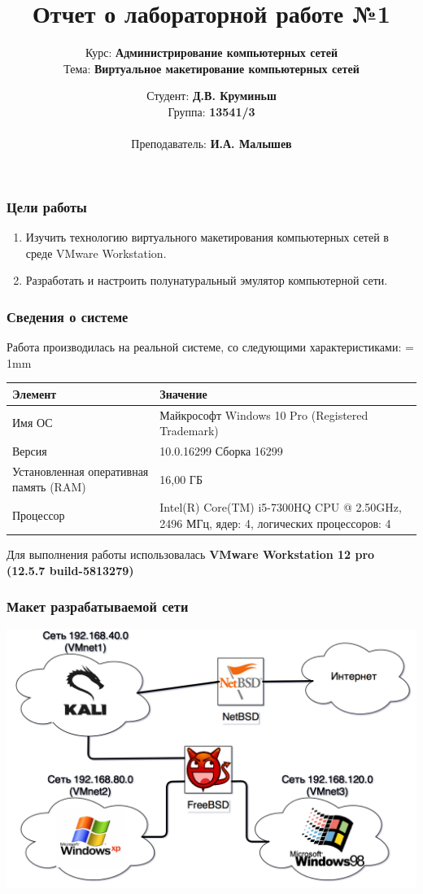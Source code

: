 \documentclass[9pt, compress]{beamer}
\author{Студент: \textbf{Д.В. Круминьш}\\ 
	Группа: \textbf{13541/3}\\ \\
	Преподаватель: \textbf{И.А. Малышев} }
\title{Отчет о лабораторной работе №1}
\subtitle{Курс: \textbf{Администрирование компьютерных сетей}\\
Тема: \textbf{Виртуальное макетирование компьютерных сетей}}
\institute{Санкт-Петербургский политехнический университет Петра Великого}
\date{ }
\begin{document}
	\maketitle
\begin{frame}
\frametitle{Цели работы}
\begin{enumerate}
\item Изучить технологию виртуального макетирования компьютерных сетей в среде VMware Workstation.
\item Разработать и настроить полунатуральный эмулятор компьютерной сети.
\end{enumerate}
\end{frame}

\begin{frame}
\frametitle{Сведения о системе}
Работа производилась на реальной системе, со следующими характеристиками:
\tabulinesep = 1mm
\begin{longtabu} to \textwidth {|X[10, c , m ] |X[25, c , m ] | }\firsthline\hline

\textbf{Элемент}&\textbf{Значение}\\ \hline \endfirsthead
	
Имя ОС&Майкрософт Windows 10 Pro (Registered Trademark)\\ \hline
Версия&10.0.16299 Сборка 16299\\ \hline
Установленная оперативная память (RAM) &16,00 ГБ\\ \hline
Процессор&Intel(R) Core(TM) i5-7300HQ CPU @ 2.50GHz, 2496 МГц, ядер: 4, логических процессоров: 4\\ \hline
\end{longtabu}
Для выполнения работы использовалась \textbf{VMware Workstation 12 pro (12.5.7 build-5813279)}
\end{frame}

\begin{frame}
\frametitle{Макет разрабатываемой сети}
\begin{center}  
	\includegraphics[width=\textwidth]{img/KKS_simple}
\end{center}
\end{frame}
\end{document}
